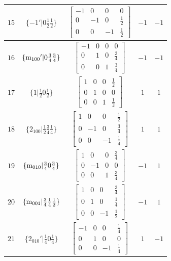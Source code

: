 \documentclass[fleqn,8pt]{jsarticle}
\begin{document}
\begin{longtable}{ccccc}
$ 15 $ & $ \{-1{}'|0 \frac{1}{2} \frac{1}{2}\} $ & $ \begin{bmatrix} -1 & 0 & 0 & 0 \\ 0 & -1 & 0 & \frac{1}{2} \\ 0 & 0 & -1 & \frac{1}{2} \end{bmatrix} $ & $ -1 $ & $ -1 $ \\ \hline
$ 16 $ & $ \{{\rm m}_{100}{}'|0 \frac{3}{4} \frac{3}{4}\} $ & $ \begin{bmatrix} -1 & 0 & 0 & 0 \\ 0 & 1 & 0 & \frac{3}{4} \\ 0 & 0 & 1 & \frac{3}{4} \end{bmatrix} $ & $ -1 $ & $ -1 $ \\ \hline
$ 17 $ & $ \{1|\frac{1}{2} 0 \frac{1}{2}\} $ & $ \begin{bmatrix} 1 & 0 & 0 & \frac{1}{2} \\ 0 & 1 & 0 & 0 \\ 0 & 0 & 1 & \frac{1}{2} \end{bmatrix} $ & $ 1 $ & $ 1 $ \\ \hline
$ 18 $ & $ \{2{}_{100}|\frac{1}{2} \frac{3}{4} \frac{1}{4}\} $ & $ \begin{bmatrix} 1 & 0 & 0 & \frac{1}{2} \\ 0 & -1 & 0 & \frac{3}{4} \\ 0 & 0 & -1 & \frac{1}{4} \end{bmatrix} $ & $ 1 $ & $ 1 $ \\ \hline
$ 19 $ & $ \{{\rm m}_{010}|\frac{3}{4} 0 \frac{3}{4}\} $ & $ \begin{bmatrix} 1 & 0 & 0 & \frac{3}{4} \\ 0 & -1 & 0 & 0 \\ 0 & 0 & 1 & \frac{3}{4} \end{bmatrix} $ & $ -1 $ & $ 1 $ \\ \hline
$ 20 $ & $ \{{\rm m}_{001}|\frac{3}{4} \frac{1}{4} \frac{1}{2}\} $ & $ \begin{bmatrix} 1 & 0 & 0 & \frac{3}{4} \\ 0 & 1 & 0 & \frac{1}{4} \\ 0 & 0 & -1 & \frac{1}{2} \end{bmatrix} $ & $ -1 $ & $ 1 $ \\ \hline
$ 21 $ & $ \{2{}_{010}{}'|\frac{1}{4} 0 \frac{1}{4}\} $ & $ \begin{bmatrix} -1 & 0 & 0 & \frac{1}{4} \\ 0 & 1 & 0 & 0 \\ 0 & 0 & -1 & \frac{1}{4} \end{bmatrix} $ & $ 1 $ & $ -1 $ \\ \hline

\end{longtable}
\end{document}
